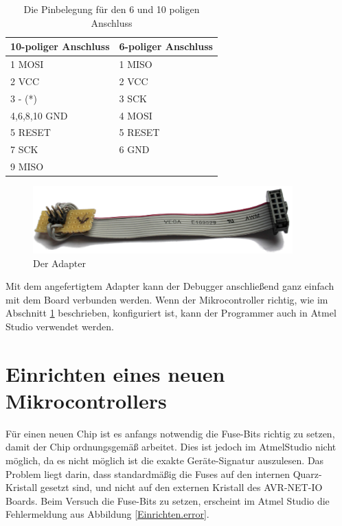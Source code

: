\begin{table}[H]
\centering
\begin{tabular}{|l|l|} \hline
	 \textbf{10-poliger Anschluss} & \textbf{6-poliger Anschluss} \\ \hline
	 1 MOSI & 1 MISO \\ \hline
	 2 VCC & 2 VCC \\ \hline
	 3 - (*) & 3 SCK \\ \hline
	 4,6,8,10 GND & 4 MOSI \\ \hline
	 5 RESET & 5 RESET \\ \hline
	 7 SCK & 6 GND \\ \hline
	 9 MISO &   \\ \hline
\end{tabular}
\caption{Die Pinbelegung für den 6 und 10 poligen Anschluss \cite{mikrocontroller.isp}}
\label{pinbelegung}
\end{table}

\begin{figure}[htp]
\begin{center}
  \includegraphics[width=10cm]{content/pictures/Anleitung/adapter.jpg}
  \caption{Der Adapter}
  \label{adapter}
\end{center}
\end{figure}

Mit dem angefertigtem Adapter kann der Debugger anschließend ganz einfach mit
dem Board verbunden werden. Wenn der Mikrocontroller richtig, wie im Abschnitt
\ref{Chapt:Einrichten} beschrieben, konfiguriert ist, kann der Programmer auch in Atmel
Studio verwendet werden.

\section{Einrichten eines neuen Mikrocontrollers}
\label{Chapt:Einrichten}

Für einen neuen Chip ist es anfangs notwendig die Fuse-Bits richtig zu setzen,
damit der Chip ordnungsgemäß arbeitet.
Dies ist jedoch im AtmelStudio nicht möglich, da es nicht möglich ist die exakte
Geräte-Signatur auszulesen.
Das Problem liegt darin, dass standardmäßig die Fuses auf den internen
Quarz-Kristall gesetzt sind, und nicht auf den externen Kristall des
AVR-NET-IO Boards.
Beim Versuch die Fuse-Bits zu setzen, erscheint im Atmel Studio die
Fehlermeldung aus Abbildung \ref{Einrichten.error}.

